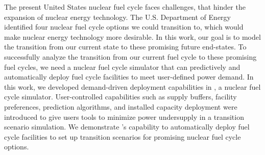 \vspace{-0.2in}
The present United States nuclear fuel cycle faces challenges, that hinder 
the expansion of nuclear energy technology. 
The U.S. Department of Energy identified four nuclear fuel cycle 
options we could transition to, which would make nuclear energy technology
more desirable. 
In this work, our goal is to model the transition from our current
state to these promising future end-states. 
To successfully analyze the transition from our current 
fuel cycle to these promising fuel cycles, we need a nuclear 
fuel cycle simulator that can predictively and automatically 
deploy fuel cycle facilities to meet user-defined power demand. 
In this work, we developed demand-driven deployment capabilities in 
\Cyclus, a nuclear fuel cycle simulator.  
User-controlled capabilities such as supply buffers, 
facility preferences, prediction algorithms, and installed capacity 
deployment were introduced to give users tools to minimize power 
undersupply in a transition scenario simulation. 
We demonstrate \deploy's capability to automatically deploy fuel 
cycle facilities to set up transition scenarios for promising 
nuclear fuel cycle options. 